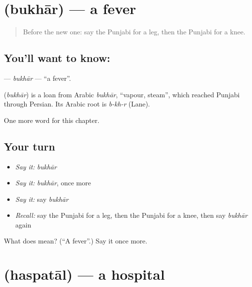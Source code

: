 \section[\texorpdfstring{\pa{ਬੁਖ਼ਾਰ} (bukhār)}{ਬੁਖ਼ਾਰ (bukhār)}]{ (bukhār) — a fever}

\label{lesson:PA-C51-bukhar}



\begin{quote}
Before the new one: say the Punjabi for a leg, then the Punjabi for a knee.
\end{quote}

\subsection*{You'll want to know: }
\textbf{} — \emph{bukhār} — \textquotedblleft{}a fever\textquotedblright{}.

\begin{cousinweb}
\textbf{} (\emph{bukhār}) is a loan from Arabic \emph{bukhār}, \textquotedblleft{}vapour, steam\textquotedblright{}, which reached Punjabi through Persian. Its Arabic root is \emph{b-kh-r} (Lane).
\end{cousinweb}

\begin{grammarlens}[title={What you've built}]
One more word for this chapter.
\end{grammarlens}

\subsection*{Your turn}
\begin{itemize}
\raggedright
  \item \emph{Say it:} \emph{bukhār}
  \item \emph{Say it:} \emph{bukhār}, once more
  \item \emph{Say it:} say \emph{bukhār}
  \item \emph{Recall:} say the Punjabi for a leg, then the Punjabi for a knee, then say \emph{bukhār} again
\end{itemize}

\begin{tcolorbox}[breakable,colback=teal!4,colframe=teal!35!black,title={Before you move on}]
What does  mean? (\textquotedblleft{}A fever\textquotedblright{}.) Say it once more.
\end{tcolorbox}
\section[\texorpdfstring{\pa{ਹਸਪਤਾਲ} (haspatāl)}{ਹਸਪਤਾਲ (haspatāl)}]{ (haspatāl) — a hospital}


